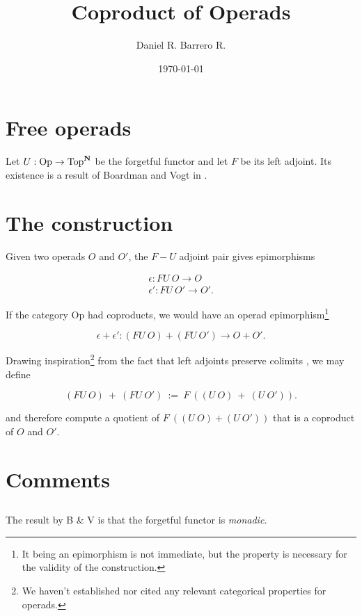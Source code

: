 \documentclass{amsart}
\title{Coproduct of Operads}
\author{Daniel R. Barrero R.}
\date{\today}
\begin{document}
\maketitle

\section{Free operads}

Let $U : \mathrm{Op} \to \mathrm{Top}^{\mathbf{N}}$ be the forgetful functor and let $F$ be its
left adjoint. Its existence is a result of Boardman and Vogt in \cite{bv-hiasots}.

\section{The construction}

Given two operads $O$ and $O'$, the $F-U$ adjoint pair gives epimorphisms 

\begin{eqnarray}\label{fu-epis}
	\epsilon : FU \ O \to O \\
	\epsilon' : FU \ O' \to O'.
\end{eqnarray}

If the category $\mathrm{Op}$ had coproducts, we would have an operad
epimorphism\footnote{It being an epimorphism is not immediate, but the
property is necessary for the validity of the construction.}

\begin{equation}\label{cpd-epis}
	\epsilon + \epsilon' : (FU \ O) + (FU \ O') \to O + O'.
\end{equation}

Drawing inspiration\footnote{We haven't established nor cited any relevant
categorical properties for operads.} from the fact that left adjoints
preserve colimits \cite{riehl-ctic}, we may define


\begin{equation}\label{fu-coprod}
	(FU \ O) \ + \ (FU \ O') \ := \ F \ \left( (U \ O) \ + \ (U \ O')
	\right).
\end{equation}

and therefore compute a quotient of $F \ \left( (U \ O) + (U \ O')
\right)$ that is a coproduct of $O$ and $O'$.

\section{Comments}

\subsection{} The result by B \& V is that the forgetful functor is \emph{monadic.}
\end{document}
